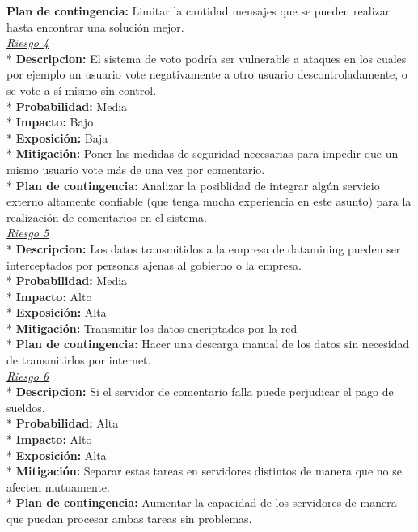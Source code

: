 {\bf{Plan de contingencia:}} Limitar la cantidad mensajes que se pueden realizar hasta encontrar una solución mejor.\\
\newline
\uline{\it{Riesgo 4}}\\*
{\bf{Descripcion:}} El sistema de voto podría ser vulnerable a ataques en los cuales por ejemplo un usuario vote negativamente a otro usuario descontroladamente, o se vote a sí mismo sin control.\\*
{\bf{Probabilidad:}} Media\\*
{\bf{Impacto:}} Bajo\\*
{\bf{Exposición:}} Baja\\*
{\bf{Mitigación:}} Poner las medidas de seguridad necesarias para impedir que un mismo usuario vote más de una vez por comentario.\\*
{\bf{Plan de contingencia:}} Analizar la posiblidad de integrar algún servicio externo altamente confiable (que tenga mucha experiencia en este asunto) para la realización de comentarios en el sistema.\\
\newline
\uline{\it{Riesgo 5}}\\*
{\bf{Descripcion:}} Los datos transmitidos a la empresa de datamining pueden ser interceptados por personas ajenas al gobierno o la empresa.\\*
{\bf{Probabilidad:}} Media\\*
{\bf{Impacto:}} Alto\\*
{\bf{Exposición:}} Alta\\*
{\bf{Mitigación:}} Transmitir los datos encriptados por la red\\*
{\bf{Plan de contingencia:}} Hacer una descarga manual de los datos sin necesidad de transmitirlos por internet.\\
\newline
\uline{\it{Riesgo 6}}\\*
{\bf{Descripcion:}} Si el servidor de comentario falla puede perjudicar el pago de sueldos.\\*
{\bf{Probabilidad:}} Alta\\*
{\bf{Impacto:}} Alto\\*
{\bf{Exposición:}} Alta\\*
{\bf{Mitigación:}} Separar estas tareas en servidores distintos de manera que no se afecten mutuamente.\\*
{\bf{Plan de contingencia:}} Aumentar la capacidad de los servidores de manera que puedan procesar ambas tareas sin problemas.\\
